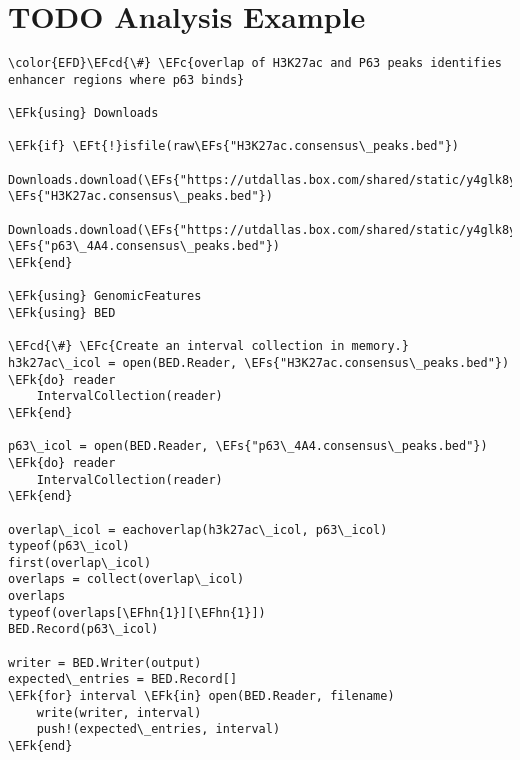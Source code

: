 \documentclass[bigger]{beamer}
\newcommand{\EFc}[1]{\textcolor{EFc}{#1}} %
\newcommand{\EFcd}[1]{\textcolor{EFcd}{#1}} %
\newcommand{\EFs}[1]{\textcolor{EFs}{#1}} %
\newcommand{\EFk}[1]{\textcolor{EFk}{#1}} %
\newcommand{\EFt}[1]{\textcolor{EFt}{#1}} %
\newcommand{\EFhn}[1]{\textcolor{EFhn}{\textbf{#1}}} %
\begin{document}
\section*{{\bfseries\sffamily TODO} Analysis Example}
\label{sec:orge6ff876}

\begin{Code}
\begin{Verbatim}
\color{EFD}\EFcd{\#} \EFc{overlap of H3K27ac and P63 peaks identifies enhancer regions where p63 binds}

\EFk{using} Downloads

\EFk{if} \EFt{!}isfile(raw\EFs{"H3K27ac.consensus\_peaks.bed"})
    Downloads.download(\EFs{"https://utdallas.box.com/shared/static/y4glk8y8chjq5fuv6iowe6bjz1vovkr3.bed"}, \EFs{"H3K27ac.consensus\_peaks.bed"})
    Downloads.download(\EFs{"https://utdallas.box.com/shared/static/y4glk8y8chjq5fuv6iowe6bjz1vovkr3.bed"}, \EFs{"p63\_4A4.consensus\_peaks.bed"})
\EFk{end}

\EFk{using} GenomicFeatures
\EFk{using} BED

\EFcd{\#} \EFc{Create an interval collection in memory.}
h3k27ac\_icol = open(BED.Reader, \EFs{"H3K27ac.consensus\_peaks.bed"}) \EFk{do} reader
    IntervalCollection(reader)
\EFk{end}

p63\_icol = open(BED.Reader, \EFs{"p63\_4A4.consensus\_peaks.bed"}) \EFk{do} reader
    IntervalCollection(reader)
\EFk{end}

overlap\_icol = eachoverlap(h3k27ac\_icol, p63\_icol)
typeof(p63\_icol)
first(overlap\_icol)
overlaps = collect(overlap\_icol)
overlaps
typeof(overlaps[\EFhn{1}][\EFhn{1}])
BED.Record(p63\_icol)

writer = BED.Writer(output)
expected\_entries = BED.Record[]
\EFk{for} interval \EFk{in} open(BED.Reader, filename)
    write(writer, interval)
    push!(expected\_entries, interval)
\EFk{end}
\end{Verbatim}
\end{Code}
\end{document}
